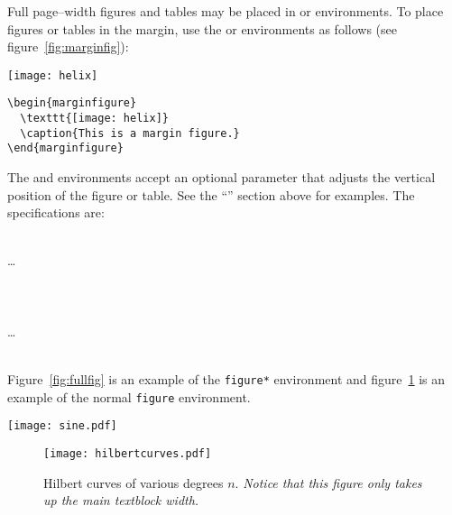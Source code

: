 \documentclass{tufte-handout}
\begin{document}
Full page--width figures and tables may be placed in  or
 environments.  To place figures or tables in the margin,
use the  or  environments as follows
(see figure~\ref{fig:marginfig}):

\begin{marginfigure}%
  \texttt{[image: helix]}
  \caption{This is a margin figure.  The helix is defined by
    $x = \cos(2\pi z)$, $y = \sin(2\pi z)$, and $z = [0, 2.7]$.  The figure was
    drawn using Asymptote (\url{http://asymptote.sf.net/}).}
  \label{fig:marginfig}
\end{marginfigure}
\begin{Verbatim}
\begin{marginfigure}
  \texttt{[image: helix]}
  \caption{This is a margin figure.}
\end{marginfigure}
\end{Verbatim}

The  and  environments accept an optional parameter  that adjusts the vertical position of the figure or table.  See the ``'' section above for examples.  The specifications are:
\begin{docspec}
  \\
  \qquad\ldots\\
  \\
  \mbox{}\\
  \\
  \qquad\ldots\\
  \\
\end{docspec}

Figure~\ref{fig:fullfig} is an example of the \Verb|figure*|
environment and figure~\ref{fig:textfig} is an example of the normal
\Verb|figure| environment.

\begin{figure*}[h]
  \texttt{[image: sine.pdf]}%
  \caption{This graph shows $y = \sin x$ from about $x = [-10, 10]$.
  \emph{Notice that this figure takes up the full page width.}}%
  \label{fig:fullfig}%
\end{figure*}

\begin{figure}
  \texttt{[image: hilbertcurves.pdf]}
  \caption{Hilbert curves of various degrees $n$.
  \emph{Notice that this figure only takes up the main textblock width.}}
  \label{fig:textfig}
\end{figure}
\end{document}
